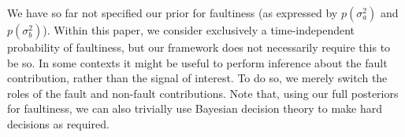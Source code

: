\documentclass[twoside]{article}
\newcommand{\psff}[1]{\texttt{[image: \#1.eps]}}
\begin{document}
We have so far not specified our prior for faultiness (as expressed by
$p(\sigma_a^2)$ and $p(\sigma_b^2)$). Within this paper, we consider
exclusively a time-independent probability of faultiness, but our framework does not necessarily require this to be so. In some contexts it might be useful to perform inference about the
fault contribution, rather than the signal of interest.  To do so, we merely switch the roles of the fault and non-fault
contributions. Note that, using our full posteriors for faultiness, we
can also trivially use Bayesian decision theory to make hard decisions
as required.

\end{document}
